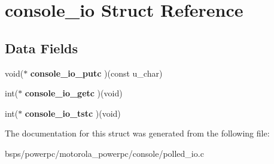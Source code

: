\hypertarget{structconsole__io}{}\section{console\+\_\+io Struct Reference}
\label{structconsole__io}
\subsection*{Data Fields}
\begin{DoxyCompactItemize}
\item 
\mbox{\label{structconsole__io_a5f8afe8db6b319b06d8c345b5f195606}} 
void($\ast$ {\bfseries console\+\_\+io\+\_\+putc} )(const u\+\_\+char)
\item 
\mbox{\label{structconsole__io_aca88305e31c8d38a1e54f4f525a46ff3}} 
int($\ast$ {\bfseries console\+\_\+io\+\_\+getc} )(void)
\item 
\mbox{\label{structconsole__io_a73bb9c519c5594622842ad63015b2dd9}} 
int($\ast$ {\bfseries console\+\_\+io\+\_\+tstc} )(void)
\end{DoxyCompactItemize}


The documentation for this struct was generated from the following file\+:\begin{DoxyCompactItemize}
\item 
bsps/powerpc/motorola\+\_\+powerpc/console/polled\+\_\+io.\+c\end{DoxyCompactItemize}
